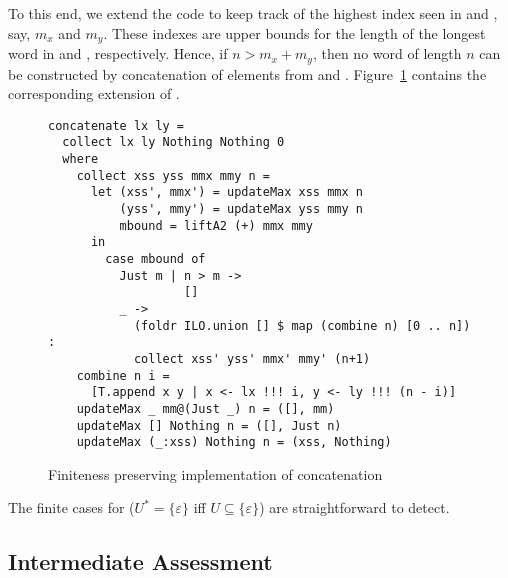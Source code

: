To this end, we extend the code to keep track of the highest index
seen in  and , say, $m_x$ and $m_y$. These indexes
are upper bounds for the length of the longest word in  and
, respectively. Hence, if $n > m_x + m_y$, then no word of
length $n$ can be constructed by concatenation of elements from
 and
. Figure~\ref{fig:finite-concatenation-segmented} contains
the corresponding extension of .
\begin{figure}[tp]
\begin{lstlisting}
concatenate lx ly =
  collect lx ly Nothing Nothing 0
  where
    collect xss yss mmx mmy n =
      let (xss', mmx') = updateMax xss mmx n
          (yss', mmy') = updateMax yss mmy n
          mbound = liftA2 (+) mmx mmy
      in
        case mbound of
          Just m | n > m ->
                   []
          _ ->
            (foldr ILO.union [] $ map (combine n) [0 .. n]) :
            collect xss' yss' mmx' mmy' (n+1)
    combine n i =
      [T.append x y | x <- lx !!! i, y <- ly !!! (n - i)]
    updateMax _ mm@(Just _) n = ([], mm)
    updateMax [] Nothing n = ([], Just n)
    updateMax (_:xss) Nothing n = (xss, Nothing)
\end{lstlisting}
  \caption{Finiteness preserving implementation of concatenation}
  \label{fig:finite-concatenation-segmented}
\end{figure}

The finite cases for  ($U^* = \{\varepsilon\}$ iff
$U\subseteq\{\varepsilon\}$) are straightforward to detect.

\subsection{Intermediate Assessment}
\label{sec:interm-assessm}




\clearpage{}

